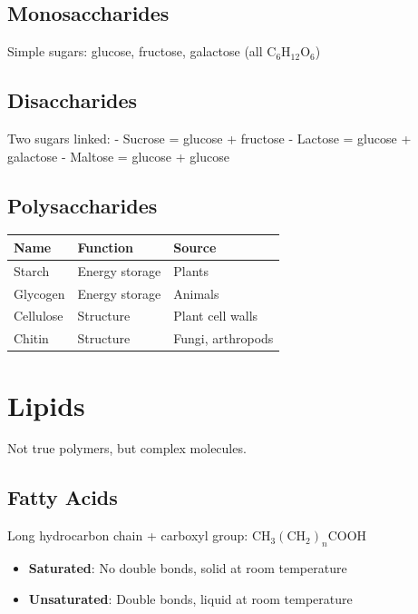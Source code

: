 \documentclass[
  11pt,
  letterpaper,
  twoside,
  openright]{book}
\providecommand{\tightlist}{%
  \setlength{\itemsep}{0pt}\setlength{\parskip}{0pt}}
\begin{document}
\subsection{Monosaccharides}\label{monosaccharides}

Simple sugars: glucose, fructose, galactose (all
\(\text{C}_6\text{H}_{12}\text{O}_6\))

\subsection{Disaccharides}\label{disaccharides}

Two sugars linked: - Sucrose = glucose + fructose - Lactose = glucose +
galactose - Maltose = glucose + glucose

\subsection{Polysaccharides}\label{polysaccharides}

\begin{longtable}[]{@{}lll@{}}
\toprule\noalign{}
Name & Function & Source \\
\midrule\noalign{}
\endhead
\bottomrule\noalign{}
\endlastfoot
Starch & Energy storage & Plants \\
Glycogen & Energy storage & Animals \\
Cellulose & Structure & Plant cell walls \\
Chitin & Structure & Fungi, arthropods \\
\end{longtable}

\section{Lipids}\label{lipids}

Not true polymers, but complex molecules.

\subsection{Fatty Acids}\label{fatty-acids}

Long hydrocarbon chain + carboxyl group:
\(\text{CH}_3(\text{CH}_2)_n\text{COOH}\)

\begin{itemize}
\tightlist
\item
  \textbf{Saturated}: No double bonds, solid at room temperature
\item
  \textbf{Unsaturated}: Double bonds, liquid at room temperature
\end{itemize}
\end{document}
